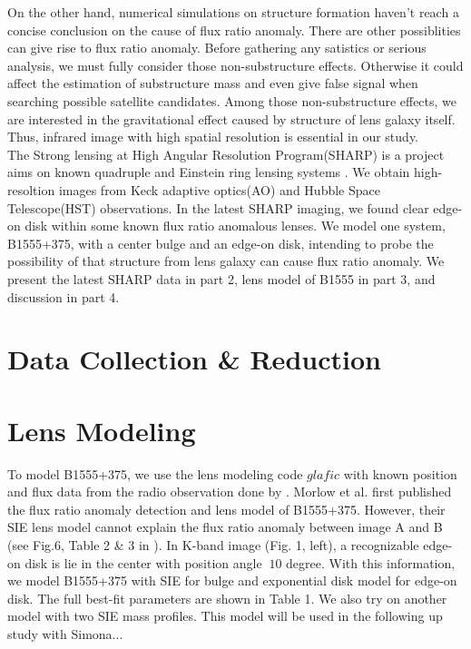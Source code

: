 \documentclass[manuscript]{emulateapj}
\begin{document}
On the other hand, numerical simulations on structure formation haven't reach a concise conclusion on the cause of flux ratio anomaly. There are other possiblities can give rise to flux ratio anomaly. Before gathering any satistics or serious analysis, we must fully consider those non-substructure effects. Otherwise it could affect the estimation of substructure mass and even give false signal when searching possible satellite candidates. Among those non-substructure effects, we are interested in the gravitational effect caused by structure of lens galaxy itself. Thus, infrared image with high spatial resolution is essential in our study.\\
The Strong lensing at High Angular Resolution Program(SHARP) is a project aims on known quadruple and Einstein ring lensing systems \citep{SHARP12}. We obtain high-resoltion images from Keck adaptive optics(AO) and Hubble Space Telescope(HST) observations. In the latest SHARP imaging, we found clear edge-on disk within some known flux ratio anomalous lenses. We model one system, B1555+375, with a center bulge and an edge-on disk, intending to probe the possibility of that structure from lens galaxy can cause flux ratio anomaly. We present the latest SHARP data in part 2, lens model of B1555 in part 3, and discussion in part 4. 

\section{Data Collection \& Reduction}

\section{Lens Modeling}
To model B1555+375, we use the lens modeling code $glafic$ \citep{Oguri} with known position and flux data from the radio observation done by \citet{Marlow}. Morlow et al. first published the flux ratio anomaly detection and lens model of B1555+375. However, their SIE lens model cannot explain the flux ratio anomaly between image A and B (see Fig.6, Table 2 \& 3 in \citet{Marlow}). In K-band image (Fig. 1, left), a recognizable edge-on disk is lie in the center with position angle $~10$ degree. With this information, we model B1555+375 with SIE for bulge and exponential disk model for edge-on disk. The full best-fit parameters are shown in Table 1. We also try on another model with two SIE mass profiles. This model will be used in the following up study with Simona...
\end{document}

